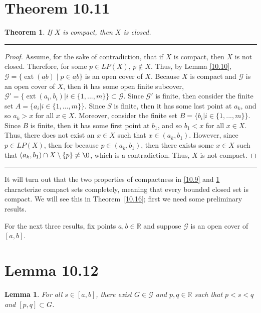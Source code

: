 \documentclass[openany, amssymb, psamsfonts]{amsart}
\newcommand{\bbR}{\mathbb{R}}
\renewcommand{\emptyset}{\O}
\DeclareMathOperator{\ext}{ext}
\newtheorem{thm}{Theorem}[section]
\newtheorem{lem}{Lemma}[section]
\theoremstyle{definition}
\numberwithin{equation}{section}
\begin{document}
\section*{Theorem 10.11}
\begin{thm} \label{10.11} If $X$ is compact, then $X$ is closed.
\end{thm}
\vspace{4pt}     \hrule   \vspace{4pt}\begin{proof}
Assume, for the sake of contradiction, that if $X$ is compact, then $X$ is not closed. Therefore, for some $p\in LP(X)$, $p\notin X$. Thus, by Lemma \ref{10.10}, $\mathcal{G} = \{ \ext(\underline{ab}) \mid p\in \underline{ab}\}  $ is an open cover of $X$. Because $X$ is compact and $\mathcal{G}$ is an open cover of $X$, then it has some open finite subcover, $\mathcal{G}' = \{\ext(a_i,b_i)|i\in\{1,...,m\}\}\subset \mathcal{G}$. Since $\mathcal{G}'$ is finite, then consider the finite set $A = \{a_i | i\in \{1,...,m\} \}$. Since $S$ is finite, then it has some last point at $a_k$, and so $a_k>x$ for all $x\in X$. Moreover, consider the finite set $B = \{b_i | i\in \{1,...,m\} \}$. Since $B$ is finite, then it has some first point at $b_1$, and so $b_1< x$ for all $x\in X$. Thus, there does not exist an $x\in X$ such that $x\in (a_k,b_1)$. However, since $p\in LP(X)$, then for because $p\in (a_k,b_1)$, then there exists some $x\in X$ such that $(a_k,b_1)\cap X\setminus \{p\} \neq \emptyset$, which is a contradiction. 
Thus, $X$ is not compact.
\end{proof}\vspace{4pt}     \hrule   \vspace{4pt}

It will turn out that the two properties of compactness in \ref{10.9} and \ref{10.11} characterize compact sets completely, meaning that every bounded closed set is compact. We will see this in Theorem~\ref{10.16}; first we need some preliminary results.\newline 

\newcommand\cG{\mathcal G}
\newcommand\cR{\mathcal R}

For the next three results, fix points $a,b\in \bbR$ and suppose $\cG$ is an open cover of $[a,b]$.

\section*{Lemma 10.12}
\begin{lem}
\label{10.12}
For all $s\in[a,b]$, there exist $G\in\cG$ and $p,q\in \bbR$ such that $p<s<q$ and $[p,q]\subset G$.
\end{lem}
\end{document}
